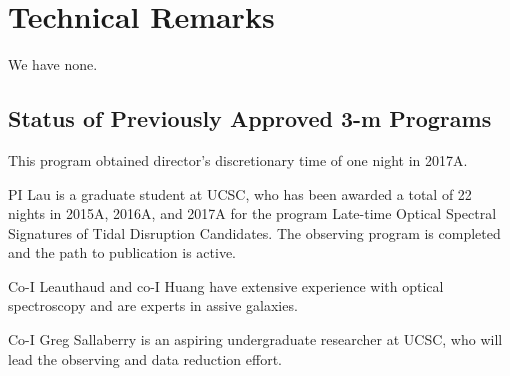 \documentclass[letterpaper,12pt]{article}
\begin{document}
\section{Technical Remarks}

We have none. 

\subsection{Status of Previously Approved 3-m Programs}

This program obtained director's discretionary time of one night in 2017A.

PI Lau is a graduate student at UCSC, who has been awarded a total of 22 nights in 2015A, 2016A, 
and 2017A for the program Late-time Optical Spectral Signatures of Tidal Disruption Candidates. 
The observing program is completed and the path to publication is active. 

Co-I Leauthaud and co-I Huang have extensive experience with optical spectroscopy and are experts 
in assive galaxies. 

Co-I Greg Sallaberry is an aspiring undergraduate researcher at UCSC, who will lead the observing 
and data reduction effort. 
\end{document}
